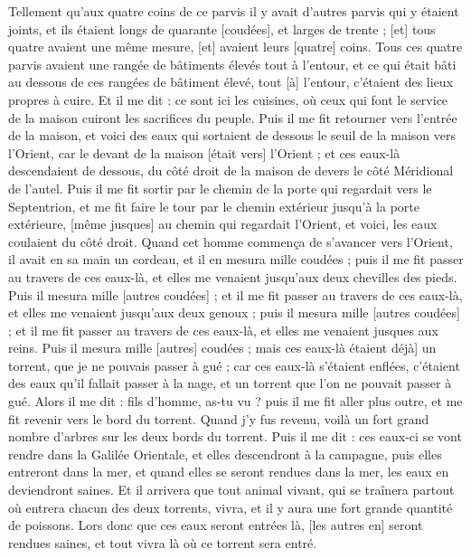 \begin{multicols}{2}
Tellement qu'aux quatre coins de ce parvis il y avait d'autres parvis qui y étaient joints, et ils étaient longs de quarante [coudées], et larges de trente ; [et] tous quatre avaient une même mesure, [et] avaient leurs [quatre] coins.
Tous ces quatre parvis avaient une rangée de bâtiments élevés tout à l'entour, et ce qui était bâti au dessous de ces rangées de bâtiment élevé, tout [à] l'entour, c'étaient des lieux propres à cuire.
Et il me dit : ce sont ici les cuisines, où ceux qui font le service de la maison cuiront les sacrifices du peuple.
\VerseOne{}Puis il me fit retourner vers l'entrée de la maison, et voici des eaux qui sortaient de dessous le seuil de la maison vers l'Orient, car le devant de la maison [était vers] l'Orient ; et ces eaux-là descendaient de dessous, du côté droit de la maison de devers le côté Méridional de l'autel.
Puis il me fit sortir par le chemin de la porte qui regardait vers le Septentrion, et me fit faire le tour par le chemin extérieur jusqu'à la porte extérieure, [même jusques] au chemin qui regardait l'Orient, et voici, les eaux coulaient du côté droit.
Quand cet homme commença de s'avancer vers l'Orient, il avait en sa main un cordeau, et il en mesura mille coudées ; puis il me fit passer au travers de ces eaux-là, et elles me venaient jusqu'aux deux chevilles des pieds.
Puis il mesura mille [autres coudées] ; et il me fit passer au travers de ces eaux-là, et elles me venaient jusqu'aux deux genoux ; puis il mesura mille [autres coudées] ; et il me fit passer au travers de ces eaux-là, et elles me venaient jusques aux reins.
Puis il mesura mille [autres] coudées ; mais ces eaux-là étaient déjà] un torrent, que je ne pouvais passer à gué ; car ces eaux-là s'étaient enflées, c'étaient des eaux qu'il fallait passer à la nage, et un torrent que l'on ne pouvait passer à gué.
Alors il me dit : fils d'homme, as-tu vu ? puis il me fit aller plus outre, et me fit revenir vers le bord du torrent.
Quand j'y fus revenu, voilà un fort grand nombre d'arbres sur les deux bords du torrent.
Puis il me dit : ces eaux-ci se vont rendre dans la Galilée Orientale, et elles descendront à la campagne, puis elles entreront dans la mer, et quand elles se seront rendues dans la mer, les eaux en deviendront saines.
Et il arrivera que tout animal vivant, qui se traînera partout où entrera chacun des deux torrents, vivra, et il y aura une fort grande quantité de poissons. Lors donc que ces eaux seront entrées là, [les autres en] seront rendues saines, et tout vivra là où ce torrent sera entré.

\end{multicols}
